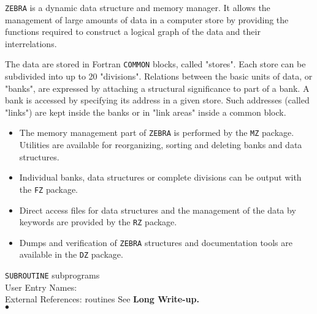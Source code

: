                       
\Submitter{}                            
{\tt ZEBRA} is a dynamic data structure and memory manager. It allows
the management of large amounts of data in a computer store by providing
the functions required to construct a logical graph of the data and
their interrelations.
\par
The data are stored in Fortran {\tt COMMON} blocks, called
"stores". Each store can be subdivided into up to 20 "divisions".
Relations between the basic units of data, or "banks", are expressed by
attaching a structural significance to part of a bank. A bank is
accessed by specifying its address in a given store. Such addresses
(called "links") are kept inside the banks or in "link areas" inside
a common block.
\begin{itemize}
\item  The memory management part of {\tt ZEBRA} is performed by
the {\tt MZ} package. Utilities are available for reorganizing, sorting
and deleting banks and data structures.
\item  Individual banks, data structures or complete divisions
can be output with the {\tt FZ} package.
\item Direct access files for data structures and the
management of the data by keywords are provided by the {\tt RZ} package.
\item  Dumps and verification of {\tt ZEBRA} structures and
documentation tools are available in the {\tt DZ} package.
\end{itemize}
\Structure
{\tt SUBROUTINE} subprograms \\
User Entry Names: \\
External References:  routines
\Usage
See {\bf Long Write-up.}
\\ $\bullet$
